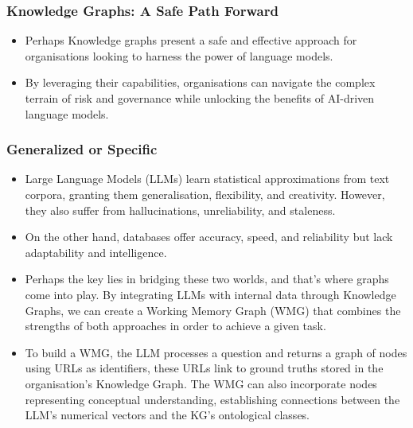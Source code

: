 \begin{frame}[fragile]\frametitle{Knowledge Graphs: A Safe Path Forward}
\begin{itemize}
\item Perhaps Knowledge graphs present a safe and effective approach for organisations looking to harness the power of language models.
\item By leveraging their capabilities, organisations can navigate the complex terrain of risk and governance while unlocking the benefits of AI-driven language models.
\end{itemize}
\end{frame}

\begin{frame}[fragile]\frametitle{Generalized or Specific}
\begin{itemize}
\item Large Language Models (LLMs) learn statistical approximations from text corpora, granting them generalisation, flexibility, and creativity. However, they also suffer from hallucinations, unreliability, and staleness.
\item On the other hand, databases offer accuracy, speed, and reliability but lack adaptability and intelligence.
\item Perhaps the key lies in bridging these two worlds, and that's where graphs come into play. By integrating LLMs with internal data through Knowledge Graphs, we can create a Working Memory Graph (WMG) that combines the strengths of both approaches in order to achieve a given task.
\item To build a WMG, the LLM processes a question and returns a graph of nodes using URLs as identifiers, these URLs link to ground truths stored in the organisation's Knowledge Graph. The WMG can also incorporate nodes representing conceptual understanding, establishing connections between the LLM's numerical vectors and the KG's ontological classes.
\end{itemize}
\end{frame}